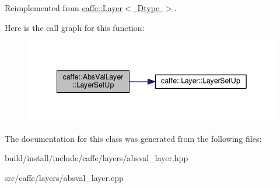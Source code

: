 Reimplemented from \mbox{\hyperlink{classcaffe_1_1_layer_a481323a3e0972c682787f2137468c29f}{caffe\+::\+Layer$<$ Dtype $>$}}.

Here is the call graph for this function\+:
\nopagebreak
\begin{figure}[H]
\begin{center}
\leavevmode
\includegraphics[width=342pt]{classcaffe_1_1_abs_val_layer_a4ef25e7d0cbe06404948d7e763bf0f84_cgraph}
\end{center}
\end{figure}


The documentation for this class was generated from the following files\+:\begin{DoxyCompactItemize}
\item 
build/install/include/caffe/layers/absval\+\_\+layer.\+hpp\item 
src/caffe/layers/absval\+\_\+layer.\+cpp\end{DoxyCompactItemize}
